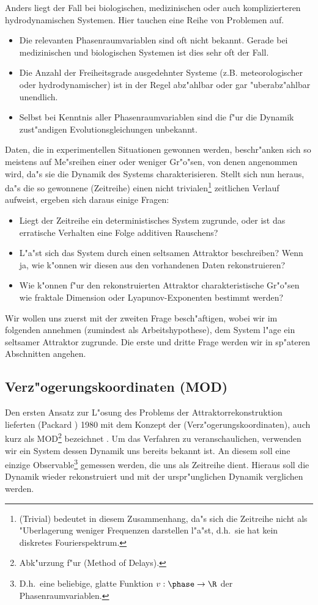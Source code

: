Anders liegt der Fall bei biologischen, medizinischen oder auch komplizierteren
hydrodynamischen Systemen. Hier tauchen eine Reihe von Problemen auf.
\begin{itemize}
\item Die relevanten Phasenraumvariablen sind oft nicht bekannt. Gerade bei
medizinischen und biologischen Systemen ist dies sehr oft der Fall.
\item Die Anzahl der Freiheitsgrade ausgedehnter Systeme (z.B. meteorologischer oder
hydrodynamischer) ist in der Regel abz"ahlbar oder gar "uberabz"ahlbar unendlich. 
\item Selbst bei Kenntnis aller Phasenraumvariablen sind die f"ur die Dynamik zust"andigen
Evolutionsgleichungen unbekannt.
\end{itemize}
Daten, die in experimentellen Situationen gewonnen werden, beschr"anken sich so meistens
auf Me"sreihen einer oder weniger Gr"o"sen, von denen angenommen wird, da"s  sie die
Dynamik des Systems charakterisieren. Stellt sich nun heraus, da"s die so gewonnene
\begriff(Zeitreihe) einen nicht trivialen\footnote{\begriff(Trivial) bedeutet in diesem
  Zusammenhang, da"s sich die Zeitreihe nicht als "Uberlagerung weniger Frequenzen
  darstellen l"a"st, d.h.\  sie hat kein diskretes
Fourierspektrum.} zeitlichen Verlauf aufweist, ergeben sich daraus einige Fragen:
\begin{itemize}
\item Liegt der Zeitreihe ein deterministisches System zugrunde, oder ist das erratische
Verhalten eine Folge additiven Rauschens?
\item L"a"st sich das System durch einen seltsamen Attraktor beschreiben? Wenn ja, wie
k"onnen wir diesen aus den vorhandenen Daten rekonstruieren?
\item Wie k"onnen f"ur den rekonstruierten Attraktor charakteristische Gr"o"sen wie
fraktale Dimension oder Lyapunov-Exponenten bestimmt werden?
\end{itemize}
Wir wollen uns zuerst mit der zweiten Frage besch"aftigen, wobei wir im folgenden annehmen
(zumindest als Arbeitshypothese), dem System l"age ein seltsamer Attraktor zugrunde.
Die erste und dritte Frage werden wir in sp"ateren Abschnitten angehen.

\subsection{Verz"ogerungskoordinaten (MOD)}

Den ersten Ansatz zur L"osung des Problems der Attraktorrekonstruktion  lieferten
\linebreak \autor(Packard \etal) 1980
mit dem Konzept der \begriff(Verz"ogerungskoordinaten), auch kurz als
MOD\footnote{Abk"urzung f"ur \begriff(Method of Delays).} bezeichnet \cite{Packard80}. Um das Verfahren 
zu veranschaulichen, verwenden wir ein System dessen Dynamik uns bereits bekannt ist. An
diesem soll eine einzige Observable\footnote{D.h.\   eine beliebige, glatte Funktion
$v:\phase\to\R$ der Phasenraumvariablen.} gemessen werden, die uns als Zeitreihe
dient. Hieraus soll die Dynamik wieder rekonstruiert und mit der urspr"unglichen Dynamik
verglichen werden.

